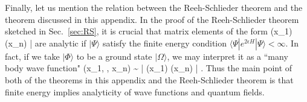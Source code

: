 \documentclass[12pt,a4paper]{article}
\theoremstyle{plain}
\theoremstyle{definition}
\numberwithin{thm}{section}
\newcommand{\bra}[1]{ \langle {#1} | }
\newcommand{\ket}[1]{ | {#1} \rangle }
\def\beq#1\eeq{\begin{align}#1\end{align}}
\begin{document}
Finally, let us mention the relation between the Reeh-Schlieder theorem and the theorem discussed in this appendix.
In the proof of the Reeh-Schlieder theorem sketched in Sec.~\ref{sec:RS}, it is crucial that matrix elements of the form
\beq
\bra{\Phi} \phi(x_1) \cdots \phi(x_n) \ket{\Psi}
\eeq
are analytic if $\ket{\Psi}$ satisfy the finite energy condition $\bra{\Psi} e^{2\epsilon H} \ket{\Psi} < \infty$. 
In fact, if we take $\ket{\Phi}$ to be a ground state $\ket{\Omega}$, we may interpret it as a ``many body wave function"
\beq
\psi(x_1, \cdots, x_n) \sim \bra{ \Omega } \phi(x_1) \cdots \phi(x_n) \ket{\Psi}.
\eeq
Thus the main point of both of the theorems in this appendix and the Reeh-Schlieder theorem is that 
finite energy implies analyticity of wave functions and quantum fields.









\end{document}
